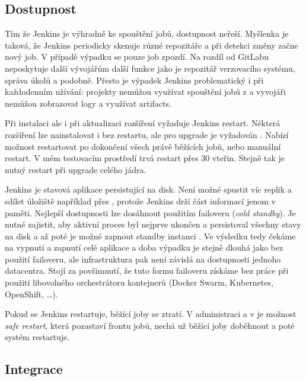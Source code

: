     \subsection{Dostupnost}
        Tím že Jenkins je výhradně ke spouštění jobů, dostupnost neřeší. Myšlenka je taková, že Jenkins periodicky skenuje různé repozitáře a při detekci změny začne nový job. V případě výpadku se pouze job zpozdí. Na rozdíl od GitLabu neposkytuje další vývojářům další funkce jako je repozitář verzovacího systému, správa úkolů a podobně. Přesto je výpadek Jenkins problematický i při každodenním užívání: projekty nemůžou využívat spouštění jobů z  a vyvojáři nemůžou zobrazovat logy a využívat artifacts.

        Při instalaci ale i při aktualizaci rozšíření vyžaduje Jenkins restart. Některá rozšíření lze nainstalovat i bez restartu, ale pro upgrade je vyžadován \cite{jenkins-norestart}. Nabízí možnost restartovat po dokončení všech právě běžících jobů, nebo manuální restart. V mém testovacím prostředí trvá restart přes 30 vteřin. Stejně tak je nutný restart při upgrade celého jádra.

        Jenkins je stavová aplikace persistující na disk. Není možné spustit víc replik a sdílet úložiště například přes , protože Jenkins drží část informací jenom v paměti. Nejlepší dostupnosti lze dosáhnout použitím failoveru (\textit{cold standby}). Je nutné zajistit, aby aktivní proces byl nejprve ukončen a persistoval všechny stavy na disk a až poté je možné zapnout standby instanci \cite{jenkins-ha}. Ve výsledku tedy čekáme na vypnutí a zapnutí celé aplikace a doba výpadku je stejně dlouhá jako bez použití failoveru, ale infrastruktura pak není závislá na dostupnosti jednoho datacentra. Stojí za povšimnutí, že tuto formu failoveru získáme bez práce při použití libovolného orchestrátoru kontejnerů (Docker Swarm, Kubernetes, OpenShift, \ldots).

        Pokud se Jenkins restartuje, běžící joby se ztratí.  V administraci a v  je možnost \textit{safe restart}, která pozastaví frontu jobů, nechá už běžící joby doběhnout a poté systém restartuje. 

    \subsection{Integrace}
        \blind[2]
        \blind[5]

